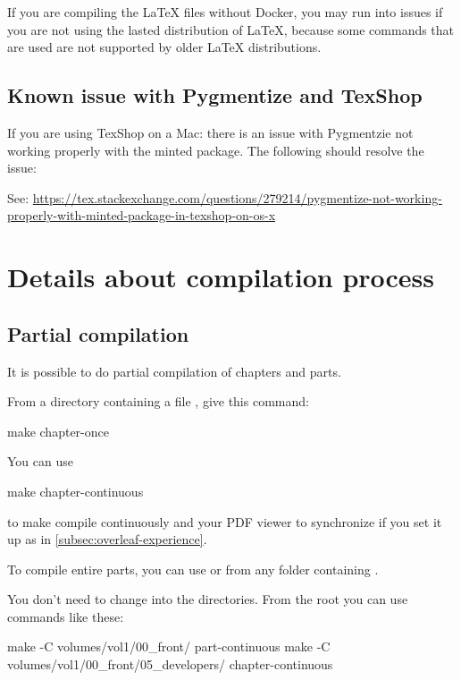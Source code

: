 If you are compiling the LaTeX files without Docker, you may run into issues if you are not using the lasted distribution of LaTeX, because some commands that are used are not supported by older LaTeX distributions. 

\subsection{Known issue with Pygmentize and TexShop}

If you are using TexShop on a Mac: there is an issue with Pygmentzie not working properly with the minted package. The following should resolve the issue: 


See: \url{https://tex.stackexchange.com/questions/279214/pygmentize-not-working-properly-with-minted-package-in-texshop-on-os-x}


\section{Details about compilation process}

\subsection{Partial compilation}

It is possible to do partial compilation of chapters and parts.

From a directory containing a file , give this command:
%
\begin{console}
    make chapter-once
\end{console}

You can use
%
\begin{console}
    make chapter-continuous
\end{console}
%
to make  compile continuously and your PDF viewer to synchronize if you set it up as in \cref{subsec:overleaf-experience}.

To compile entire parts, you can use  or  from any folder containing
.

You don't need to change into the directories.
From the root you can use commands like these:
%
\begin{console}
    make -C volumes/vol1/00_front/ part-continuous
    make -C volumes/vol1/00_front/05_developers/ chapter-continuous
\end{console}

